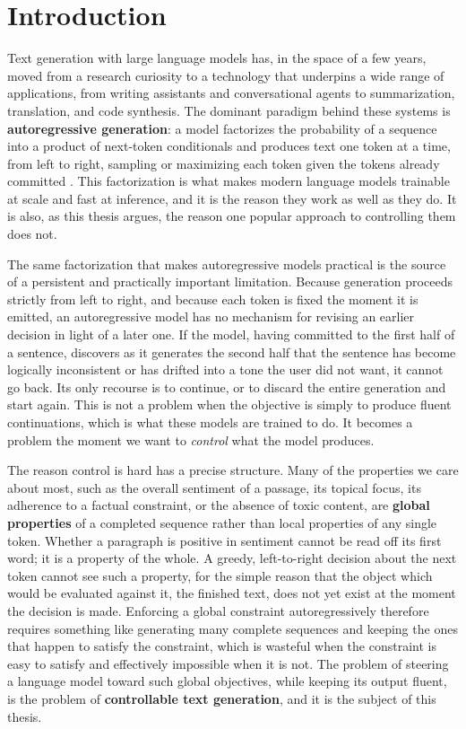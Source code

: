 \chapter{Introduction}
\label{ch:introduction}

Text generation with large language models has, in the space of a few years, moved from a research curiosity to a technology that underpins a wide range of applications, from writing assistants and conversational agents to summarization, translation, and code synthesis. The dominant paradigm behind these systems is \textbf{autoregressive generation}: a model factorizes the probability of a sequence into a product of next-token conditionals and produces text one token at a time, from left to right, sampling or maximizing each token given the tokens already committed \citep{radford2019language, brown2020language}. This factorization is what makes modern language models trainable at scale and fast at inference, and it is the reason they work as well as they do. It is also, as this thesis argues, the reason one popular approach to controlling them does not.

The same factorization that makes autoregressive models practical is the source of a persistent and practically important limitation. Because generation proceeds strictly from left to right, and because each token is fixed the moment it is emitted, an autoregressive model has no mechanism for revising an earlier decision in light of a later one. If the model, having committed to the first half of a sentence, discovers as it generates the second half that the sentence has become logically inconsistent or has drifted into a tone the user did not want, it cannot go back. Its only recourse is to continue, or to discard the entire generation and start again. This is not a problem when the objective is simply to produce fluent continuations, which is what these models are trained to do. It becomes a problem the moment we want to \emph{control} what the model produces.

The reason control is hard has a precise structure. Many of the properties we care about most, such as the overall sentiment of a passage, its topical focus, its adherence to a factual constraint, or the absence of toxic content, are \textbf{global properties} of a completed sequence rather than local properties of any single token. Whether a paragraph is positive in sentiment cannot be read off its first word; it is a property of the whole. A greedy, left-to-right decision about the next token cannot see such a property, for the simple reason that the object which would be evaluated against it, the finished text, does not yet exist at the moment the decision is made. Enforcing a global constraint autoregressively therefore requires something like generating many complete sequences and keeping the ones that happen to satisfy the constraint, which is wasteful when the constraint is easy to satisfy and effectively impossible when it is not. The problem of steering a language model toward such global objectives, while keeping its output fluent, is the problem of \textbf{controllable text generation}, and it is the subject of this thesis.

